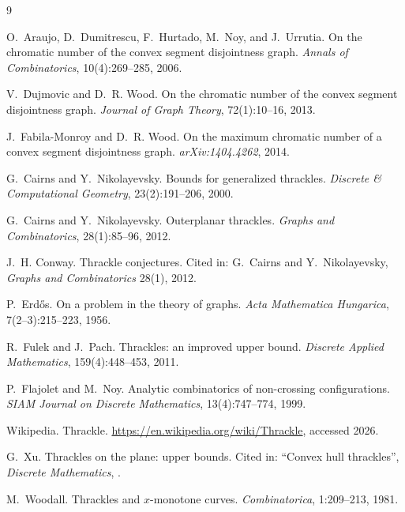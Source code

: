 \documentclass[11pt,a4paper]{article}
\theoremstyle{definition}
\theoremstyle{plain}
\begin{document}

\begin{thebibliography}{9}

O.~Araujo, D.~Dumitrescu, F.~Hurtado, M.~Noy, and J.~Urrutia.
\newblock On the chromatic number of the convex segment disjointness graph.
\newblock \emph{Annals of Combinatorics}, 10(4):269--285, 2006.

V.~Dujmovic and D.~R. Wood.
\newblock On the chromatic number of the convex segment disjointness graph.
\newblock \emph{Journal of Graph Theory}, 72(1):10--16, 2013.

J.~Fabila-Monroy and D.~R. Wood.
\newblock On the maximum chromatic number of a convex segment disjointness graph.
\newblock \emph{arXiv:1404.4262}, 2014.

G.~Cairns and Y.~Nikolayevsky.
\newblock Bounds for generalized thrackles.
\newblock \emph{Discrete \& Computational Geometry}, 23(2):191--206, 2000.

G.~Cairns and Y.~Nikolayevsky.
\newblock Outerplanar thrackles.
\newblock \emph{Graphs and Combinatorics}, 28(1):85--96, 2012.

J.~H. Conway.
\newblock Thrackle conjectures.  Cited in: G.~Cairns and Y.~Nikolayevsky,
\newblock \emph{Graphs and Combinatorics} 28(1), 2012.

P.~Erd\H{o}s.
\newblock On a problem in the theory of graphs.
\newblock \emph{Acta Mathematica Hungarica}, 7(2--3):215--223, 1956.

R.~Fulek and J.~Pach.
\newblock Thrackles: an improved upper bound.
\newblock \emph{Discrete Applied Mathematics}, 159(4):448--453, 2011.

P.~Flajolet and M.~Noy.
\newblock Analytic combinatorics of non-crossing configurations.
\newblock \emph{SIAM Journal on Discrete Mathematics}, 13(4):747--774, 1999.

Wikipedia.
\newblock Thrackle.
\newblock \url{https://en.wikipedia.org/wiki/Thrackle}, accessed 2026.

G.~Xu.
\newblock Thrackles on the plane: upper bounds.
\newblock Cited in: ``Convex hull thrackles'', \emph{Discrete Mathematics},
.

M.~Woodall.
\newblock Thrackles and $x$-monotone curves.
\newblock \emph{Combinatorica}, 1:209--213, 1981.

\end{thebibliography}
\end{document}
